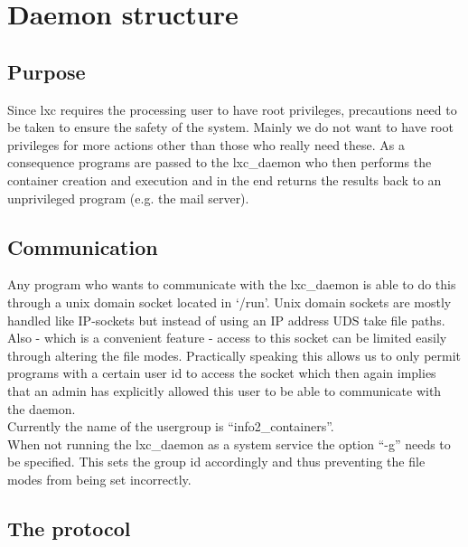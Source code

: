 \chapter{Daemon structure}

\section{Purpose}

Since lxc requires the processing user to have root privileges, precautions need to be taken to ensure
the safety of the system. Mainly we do not want to have root privileges for more actions other than those who really
need these. As a consequence programs are passed to the lxc\_daemon who then performs the container creation
and execution and in the end returns the results back to an unprivileged program (e.g. the mail server).

\section{Communication}

Any program who wants to communicate with the lxc\_daemon is able to do this through a unix domain socket located
in `/run'. Unix domain sockets are mostly handled like IP-sockets but instead of using an IP address UDS take file paths.
Also - which is a convenient feature - access to this socket can be limited easily through altering the file modes.
Practically speaking this allows us to only permit programs with a certain user id to access the socket which then again
implies that an admin has explicitly allowed this user to be able to communicate with the daemon.\\
Currently the name of the usergroup is ``info2\_containers''.\\
When not running the lxc\_daemon as a system service the option ``-g'' needs to be specified. This sets the group id
accordingly and thus preventing the file modes from being set incorrectly.

\section{The protocol}

